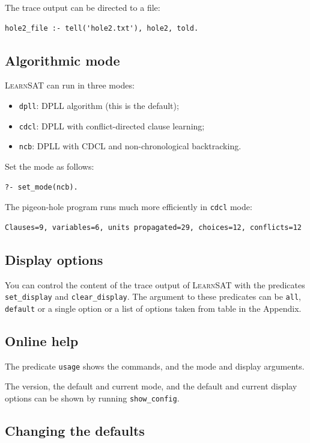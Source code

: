 \documentclass[11pt]{article}
\newcommand*{\p}[1]{\textup{\texttt{#1}}}
\newcommand*{\ls}{\textsc{LearnSAT}}
\begin{document}
The trace output can be directed to a file:

\begin{verbatim}
hole2_file :- tell('hole2.txt'), hole2, told.
\end{verbatim}

\subsection{Algorithmic mode}

\ls{} can run in three modes:
\begin{itemize}
\item \p{dpll}: DPLL algorithm (this is the default);
\item \p{cdcl}: DPLL with conflict-directed clause learning;
\item \p{ncb}:  DPLL with CDCL and non-chronological backtracking.
\end{itemize}
Set the mode as follows:
\begin{verbatim}
?- set_mode(ncb).
\end{verbatim}

The pigeon-hole program runs much more efficiently in
\p{cdcl} mode:
\begin{verbatim}
Clauses=9, variables=6, units propagated=29, choices=12, conflicts=12
\end{verbatim}

\subsection{Display options}

You can control the content of the trace output of \ls{} with the
predicates \p{set\_display} and \p{clear\_display}. The argument to
these predicates can be \p{all}, \p{default} or a single option or a
list of options taken from table in the Appendix.



\subsection{Online help}

The predicate \p{usage} shows the commands, and the mode and display
arguments.

The version, the default and current mode, and the default and current
display options can be shown by running \p{show\_config}.

\subsection{Changing the defaults}
\end{document}
